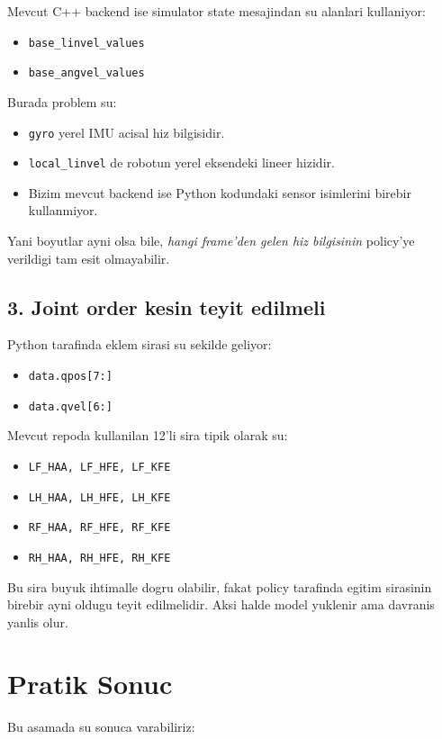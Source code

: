 \documentclass[11pt,a4paper]{article}
\begin{document}
  Mevcut C++ backend ise simulator state mesajindan su alanlari kullaniyor:

  \begin{itemize}
  \item \texttt{base\_linvel\_values}
  \item \texttt{base\_angvel\_values}
  \end{itemize}

  Burada problem su:

  \begin{itemize}
  \item \texttt{gyro} yerel IMU acisal hiz bilgisidir.
  \item \texttt{local\_linvel} de robotun yerel eksendeki lineer hizidir.
  \item Bizim mevcut backend ise Python kodundaki sensor isimlerini birebir kullanmiyor.
  \end{itemize}

  Yani boyutlar ayni olsa bile, \emph{hangi frame'den gelen hiz bilgisinin} policy'ye verildigi tam esit olmayabilir.

  \subsection*{3. Joint order kesin teyit edilmeli}
  Python tarafinda eklem sirasi su sekilde geliyor:

  \begin{itemize}
  \item \texttt{data.qpos[7:]}
  \item \texttt{data.qvel[6:]}
  \end{itemize}

  Mevcut repoda kullanilan 12'li sira tipik olarak su:

  \begin{itemize}
  \item \texttt{LF\_HAA, LF\_HFE, LF\_KFE}
  \item \texttt{LH\_HAA, LH\_HFE, LH\_KFE}
  \item \texttt{RF\_HAA, RF\_HFE, RF\_KFE}
  \item \texttt{RH\_HAA, RH\_HFE, RH\_KFE}
  \end{itemize}

  Bu sira buyuk ihtimalle dogru olabilir, fakat policy tarafinda egitim sirasinin birebir ayni oldugu teyit edilmelidir. Aksi halde model yuklenir ama davranis yanlis olur.

  \section*{Pratik Sonuc}
  Bu asamada su sonuca varabiliriz:
\end{document}
